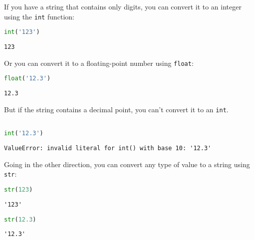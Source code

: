If you have a string that contains only digits, you can convert it to an
integer using the \passthrough{\lstinline!int!} function:

\begin{lstlisting}[language=Python,style=source]
int('123')
\end{lstlisting}

\begin{lstlisting}[style=output]
123
\end{lstlisting}

\pagebreak

Or you can convert it to a floating-point number using
\passthrough{\lstinline!float!}:

\begin{lstlisting}[language=Python,style=source]
float('12.3')
\end{lstlisting}

\begin{lstlisting}[style=output]
12.3
\end{lstlisting}

But if the string contains a decimal point, you can't convert it to an
\passthrough{\lstinline!int!}.

\begin{lstlisting}[language=Python,style=source]
%%expect ValueError

int('12.3')
\end{lstlisting}

\begin{lstlisting}[style=output]
ValueError: invalid literal for int() with base 10: '12.3'
\end{lstlisting}

Going in the other direction, you can convert any type of value to a
string using \passthrough{\lstinline!str!}:

\begin{lstlisting}[language=Python,style=source]
str(123)
\end{lstlisting}

\begin{lstlisting}[style=output]
'123'
\end{lstlisting}

\begin{lstlisting}[language=Python,style=source]
str(12.3)
\end{lstlisting}

\begin{lstlisting}[style=output]
'12.3'
\end{lstlisting}

